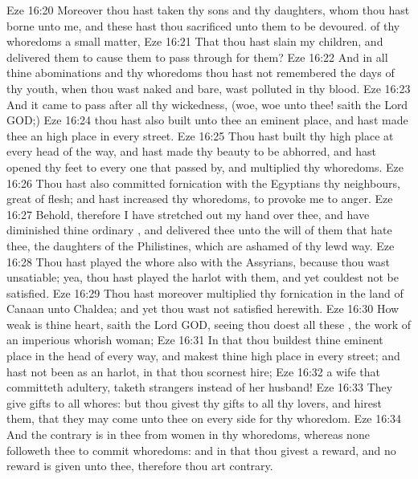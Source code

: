 \vs Eze 16:20 Moreover thou hast taken thy sons and thy daughters, whom thou hast borne unto me, and these hast thou sacrificed unto them to be devoured.  of thy whoredoms a small matter,
\vs Eze 16:21 That thou hast slain my children, and delivered them to cause them to pass through  for them?
\vs Eze 16:22 And in all thine abominations and thy whoredoms thou hast not remembered the days of thy youth, when thou wast naked and bare,  wast polluted in thy blood.
\vs Eze 16:23 And it came to pass after all thy wickedness, (woe, woe unto thee! saith the Lord GOD;)
\vs Eze 16:24  thou hast also built unto thee an eminent place, and hast made thee an high place in every street.
\vs Eze 16:25 Thou hast built thy high place at every head of the way, and hast made thy beauty to be abhorred, and hast opened thy feet to every one that passed by, and multiplied thy whoredoms.
\vs Eze 16:26 Thou hast also committed fornication with the Egyptians thy neighbours, great of flesh; and hast increased thy whoredoms, to provoke me to anger.
\vs Eze 16:27 Behold, therefore I have stretched out my hand over thee, and have diminished thine ordinary , and delivered thee unto the will of them that hate thee, the daughters of the Philistines, which are ashamed of thy lewd way.
\vs Eze 16:28 Thou hast played the whore also with the Assyrians, because thou wast unsatiable; yea, thou hast played the harlot with them, and yet couldest not be satisfied.
\vs Eze 16:29 Thou hast moreover multiplied thy fornication in the land of Canaan unto Chaldea; and yet thou wast not satisfied herewith.
\vs Eze 16:30 How weak is thine heart, saith the Lord GOD, seeing thou doest all these , the work of an imperious whorish woman;
\vs Eze 16:31 In that thou buildest thine eminent place in the head of every way, and makest thine high place in every street; and hast not been as an harlot, in that thou scornest hire;
\vs Eze 16:32  a wife that committeth adultery,  taketh strangers instead of her husband!
\vs Eze 16:33 They give gifts to all whores: but thou givest thy gifts to all thy lovers, and hirest them, that they may come unto thee on every side for thy whoredom.
\vs Eze 16:34 And the contrary is in thee from  women in thy whoredoms, whereas none followeth thee to commit whoredoms: and in that thou givest a reward, and no reward is given unto thee, therefore thou art contrary.
